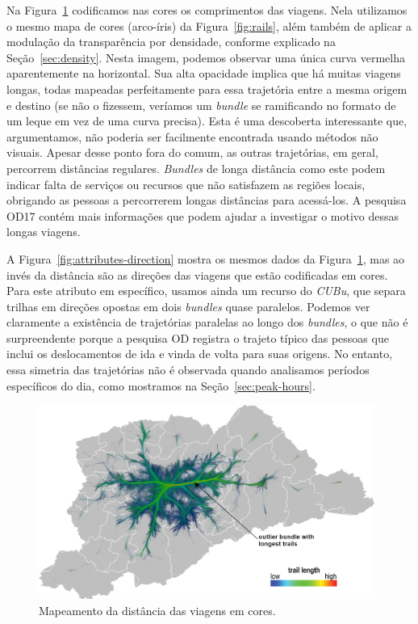 Na Figura~\ref{fig:attributes-length} codificamos nas cores os comprimentos das
viagens. Nela utilizamos o mesmo mapa de cores (arco-íris) da
Figura~\ref{fig:rails}, além também de aplicar a modulação da transparência por densidade,
conforme explicado na Seção~\ref{sec:density}. Nesta imagem, podemos observar
uma única curva vermelha aparentemente na horizontal. Sua alta opacidade implica
que há muitas viagens longas, todas mapeadas perfeitamente para essa trajetória
entre a mesma origem e destino (se não o fizessem, veríamos um \emph{bundle} se
ramificando no formato de um leque em vez de uma curva precisa). Esta é uma
descoberta interessante que, argumentamos, não poderia ser facilmente encontrada
usando métodos não visuais. Apesar desse ponto fora do comum, as outras trajetórias,
em geral, percorrem distâncias regulares. \emph{Bundles} de longa distância como
este podem indicar falta de serviços ou recursos que não satisfazem as regiões
locais, obrigando as pessoas a percorrerem longas distâncias para acessá-los. A
pesquisa OD17 contém mais informações que podem ajudar a investigar o motivo
dessas longas viagens.

A Figura~\ref{fig:attributes-direction} mostra os mesmos dados da
Figura~\ref{fig:attributes-length}, mas ao invés da distância são as direções
das viagens que estão codificadas em cores. Para este atributo em específico,
usamos ainda um recurso do \emph{CUBu}, que separa trilhas em direções opostas
em dois \emph{bundles} quase paralelos. Podemos ver claramente a existência de
trajetórias paralelas ao longo dos \emph{bundles}, o que não é surpreendente
porque a pesquisa OD registra o trajeto típico das pessoas que inclui os
deslocamentos de ida e vinda de volta para suas origens. No entanto, essa
simetria das trajetórias não é observada quando analisamos períodos
específicos do dia, como mostramos na Seção~\ref{sec:peak-hours}.

\begin{figure}[!htb] \centering \captionsetup{justification=centering}
  \includegraphics[width=0.98\textwidth]{../figuras/distances.png}
  \caption{Mapeamento da distância das viagens em cores. \label{fig:attributes-length}}
  \end{figure}

